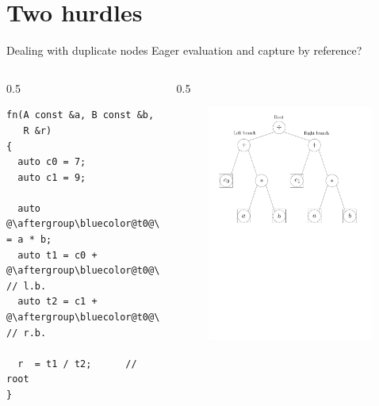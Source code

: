\documentclass[xcolor=dvipsnames]{beamer}
\begin{document}
\section{Two hurdles}


\begin{frame}[fragile]{Dealing with duplicate nodes}
Eager evaluation and capture by reference?
  \begin{columns}[T] %
    \begin{column}{0.5\textwidth}
        \begin{lstlisting}
fn(A const &a, B const &b,
   R &r)
{
  auto c0 = 7;
  auto c1 = 9;

  auto @\aftergroup\bluecolor@t0@\aftergroup\blackcolor@ = a * b;
  auto t1 = c0 + @\aftergroup\bluecolor@t0@\aftergroup\blackcolor@; // l.b.
  auto t2 = c1 + @\aftergroup\bluecolor@t0@\aftergroup\blackcolor@; // r.b.

  r  = t1 / t2;      // root
}
  \end{lstlisting}
    \end{column}%
    \hfill%
    \begin{column}{0.5\textwidth}
\begin{figure}[H]
 \centering
 \includegraphics[width=0.99\textwidth]{fig_exprtree}
\end{figure}
    \end{column}%
  \end{columns}
\end{frame}
\end{document}
